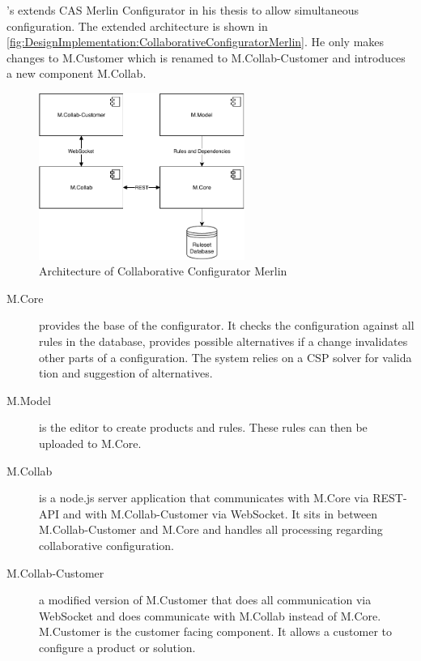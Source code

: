 \citeauthor{raabKollaborativeProduktkonfigurationEchtzeit2019}'s \cite{raabKollaborativeProduktkonfigurationEchtzeit2019} extends CAS Merlin Configurator in his thesis to allow simultaneous configuration. The extended architecture is shown in \autoref{fig:DesignImplementation:CollaborativeConfiguratorMerlin}.
He only makes changes to M.Customer which is renamed to M.Collab-Customer and introduces a new component M.Collab.

\begin{figure}
    \centering
    \includegraphics[width=0.6\textwidth]{./figures/50_design_and_implementation/MerlinCollaborativeConfigurator.pdf}
    \caption{Architecture of Collaborative Configurator Merlin \cite[Fig. 4.3]{raabKollaborativeProduktkonfigurationEchtzeit2019}}
    \label{fig:DesignImplementation:CollaborativeConfiguratorMerlin}
\end{figure}

\begin{description}
    \item[M.Core] provides the base of the configurator. It checks the configuration against all rules in the database, provides possible alternatives if a change invalidates other parts of a configuration. The system relies on a CSP solver for valida tion and suggestion of alternatives.
    \item[M.Model] is the editor to create products and rules. These rules can then be uploaded to M.Core.
    \item[M.Collab] is a node.js server application that communicates with M.Core via REST-API and with M.Collab-Customer via WebSocket. It sits in between M.Collab-Customer and M.Core and handles all processing regarding collaborative configuration.
    \item[M.Collab-Customer] a modified version of M.Customer that does all communication via WebSocket and does communicate with M.Collab instead of M.Core. M.Customer is the customer facing component. It allows a customer to configure a product or solution.
\end{description}

\FloatBarrier


